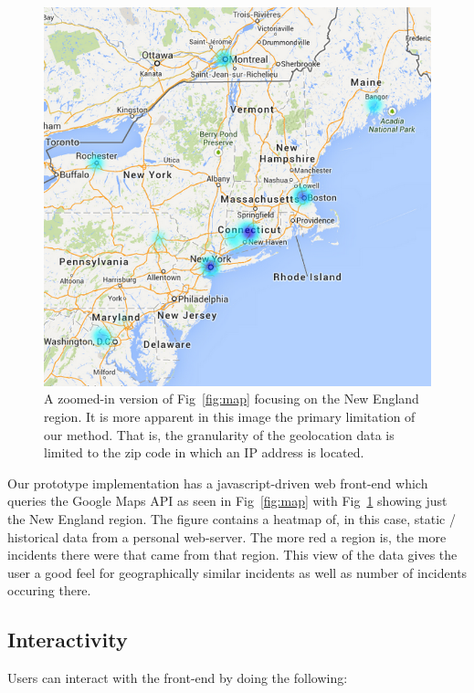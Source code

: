 \documentclass[aps,preprint,amsmath,amssymb]{revtex4}
\begin{document}
\begin{figure}
\includegraphics[width=\columnwidth]{NewEngland.png}
\caption{\label{fig:newengland} A zoomed-in version of Fig~\ref{fig:map} focusing
on the New England region. It is more apparent in this image the primary limitation
of our method. That is, the granularity of the geolocation data is limited to the
zip code in which an IP address is located.}
\end{figure}

Our prototype implementation has a javascript-driven web front-end which queries the
Google Maps API as seen in Fig~\ref{fig:map} with Fig~\ref{fig:newengland} showing just
the New England region. The figure contains a heatmap of, in
this case, static / historical data from a personal web-server. The more red a region
is, the more incidents there were that came from that region. This view of the data
gives the user a good feel for geographically similar incidents as well as number of
incidents occuring there.

\subsection{Interactivity}

Users can interact with the front-end by doing the following:
\end{document}
